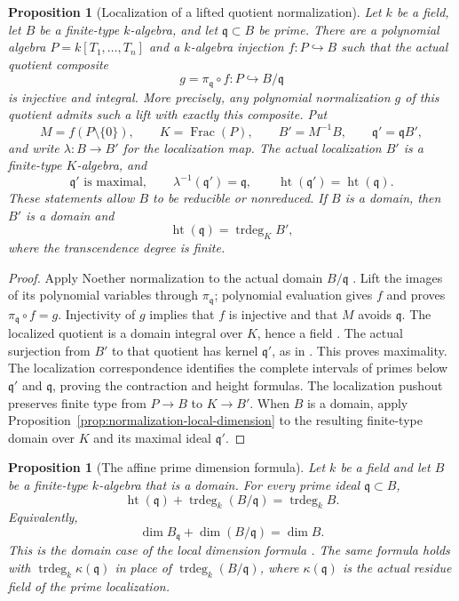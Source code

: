 \documentclass[11pt]{article}
\newtheorem{proposition}[theorem]{Proposition}
\theoremstyle{definition}
\theoremstyle{remark}
\begin{document}
\begin{proposition}[Localization of a lifted quotient normalization]
\label{prop:residue-normalization-localization}
Let \(k\) be a field, let \(B\) be a finite-type \(k\)-algebra, and
let \(\mathfrak q\subset B\) be prime. There are a polynomial algebra
\(P=k[T_1,\ldots,T_n]\) and a \(k\)-algebra injection
\(f:P\hookrightarrow B\) such that the actual quotient composite
\[
  g=\pi_{\mathfrak q}\circ f:P\hookrightarrow B/\mathfrak q
\]
is injective and integral. More precisely, any polynomial normalization
\(g\) of this quotient admits such a lift with exactly this composite.
Put
\[
  M=f(P\setminus\{0\}),\qquad K=\operatorname{Frac}(P),\qquad
  B'=M^{-1}B,\qquad \mathfrak q'=\mathfrak qB',
\]
and write \(\lambda:B\to B'\) for the localization map.
The actual localization \(B'\) is a finite-type \(K\)-algebra, and
\[
  \mathfrak q'\text{ is maximal},\qquad
  \lambda^{-1}(\mathfrak q')=\mathfrak q,\qquad
  \operatorname{ht}(\mathfrak q')=\operatorname{ht}(\mathfrak q).
\]
These statements allow \(B\) to be reducible or nonreduced.
If \(B\) is a domain, then \(B'\) is a domain and
\[
  \operatorname{ht}(\mathfrak q)
    =\operatorname{trdeg}_{K}B',
\]
where the transcendence degree is finite.
\end{proposition}

\begin{proof}
Apply Noether normalization to the actual domain \(B/\mathfrak q\)
\cite{StacksNoetherNormalization}. Lift the images of its polynomial
variables through \(\pi_{\mathfrak q}\); polynomial evaluation gives
\(f\) and proves \(\pi_{\mathfrak q}\circ f=g\). Injectivity of
\(g\) implies that \(f\) is injective and that \(M\) avoids
\(\mathfrak q\). The localized quotient is a domain integral over
\(K\), hence a field \cite{StacksIntegralDomainOverField}. The actual
surjection from \(B'\) to that quotient has kernel \(\mathfrak q'\),
as in \cite{StacksLocalizationQuotient}. This proves maximality.
The localization correspondence identifies the complete intervals of
primes below \(\mathfrak q'\) and \(\mathfrak q\), proving the
contraction and height formulas. The localization pushout preserves
finite type from \(P\to B\) to \(K\to B'\).
When \(B\) is a domain, apply
Proposition~\ref{prop:normalization-local-dimension} to the resulting
finite-type domain over \(K\) and its maximal ideal \(\mathfrak q'\).
\end{proof}

\begin{proposition}[The affine prime dimension formula]
\label{prop:affine-prime-dimension}
Let \(k\) be a field and let \(B\) be a finite-type \(k\)-algebra
that is a domain. For every prime ideal \(\mathfrak q\subset B\),
\[
  \operatorname{ht}(\mathfrak q)
    +\operatorname{trdeg}_k(B/\mathfrak q)
    =\operatorname{trdeg}_k B.
\]
Equivalently,
\[
  \dim B_{\mathfrak q}+\dim(B/\mathfrak q)=\dim B.
\]
This is the domain case of the local dimension formula
\cite{StacksAffinePrimeDimension}. The same formula holds with
\(\operatorname{trdeg}_k\kappa(\mathfrak q)\) in place of
\(\operatorname{trdeg}_k(B/\mathfrak q)\), where
\(\kappa(\mathfrak q)\) is the actual residue field of the prime
localization.
\end{proposition}
\end{document}

